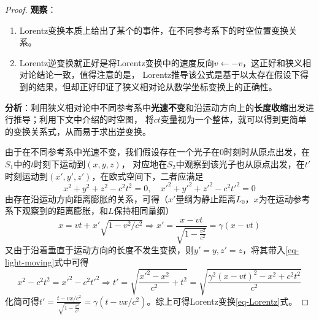 \documentclass[12pt, a4paper, oneside]{ctexart}
\numberwithin{equation}{section}  %
\begin{document}
\begin{proof}
    \textbf{观察}：
    \begin{enumerate}
        \item Lorentz变换本质上给出了某个的事件，在不同参考系下的时空位置变换关系。
        \item Lorentz逆变换就正好是将Lorentz变换中的速度反向$v\gets-v$，这正好和狭义相对论结论一致，值得注意的是，
        Lorentz推导该公式是基于以太存在假设下得到的结果，但却正好印证了狭义相对论从数学坐标变换上的正确性。
    \end{enumerate}

    \textbf{分析}：利用狭义相对论中不同参考系中\textbf{光速不变}和沿运动方向上的\textbf{长度收缩}出发进行推导；利用下文中介绍的时空图，
    将$ct$变量视为一个整体，就可以得到更简单的变换关系式，从而易于求出逆变换。

    由于在不同参考系中光速不变，我们假设存在一个光子在$0$时刻时从原点出发，在$S_1$中的$t$时刻下运动到$(x,y,z)$，
    对应地在$S_2$中观察到该光子也从原点出发，在$t'$时刻运动到$(x',y',z')$，在欧式空间下，二者应满足
    \begin{equation}\label{eq-light-moving}
        x^2+y^2+z^2 - c^2t^2 = 0,\quad x'^2+y'^2+z'^2 - c^2t'^2 = 0
    \end{equation}
    由存在沿运动方向距离膨胀的关系，可得（$x'$量纲为静止距离$L_0$，$x$为在运动参考系下观察到的距离膨胀，和$L$保持相同量纲）
    \begin{equation}\label{eq-length-contraction}
        x = vt + x'\sqrt{1-v^2/c^2}\Rightarrow x' = \frac{x-vt}{\sqrt{1-\frac{v^2}{c^2}}} = \gamma(x-vt)
    \end{equation}
    又由于沿着垂直于运动方向的长度不发生变换，则$y'=y, z'=z$，将其带入\ref{eq-light-moving}式中可得
    \begin{equation}
        x^2-c^2t^2 = x'^2-c^2t'^2 \Rightarrow t' = \sqrt{\frac{x'^2-x^2}{c^2}+t^2} = \sqrt{\frac{\gamma^2(x-vt)^2-x^2+c^2t^2}{c^2}}
    \end{equation}
    化简可得$t' = \frac{t-vx/c^2}{\sqrt{1-\frac{v^2}{c^2}}} = \gamma(t-vx/c^2)$。综上可得Lorentz变换\ref{eq-Lorentz}式。
    

\end{proof}
\end{document}
